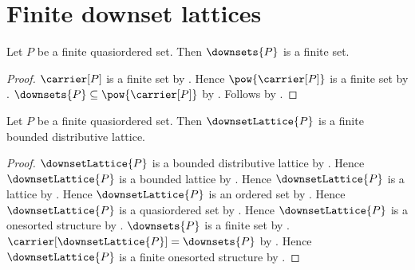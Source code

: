 \section{Finite downset lattices}





\begin{proposition}\label{finite_downsets}
    Let $P$ be a finite quasiordered set.
    Then $\downsets{P}$ is a finite set.
\end{proposition}
\begin{proof}
    $\carrier[P]$ is a finite set by .
    Hence $\pow{\carrier[P]}$ is a finite set by .
    $\downsets{P}\subseteq\pow{\carrier[P]}$ by
        .
    Follows by .
\end{proof}

\begin{theorem}\label{finite_downset_lattice}
    Let $P$ be a finite quasiordered set.
    Then $\downsetLattice{P}$ is a finite bounded distributive lattice.
\end{theorem}
\begin{proof}
    $\downsetLattice{P}$ is a bounded distributive lattice by
        .
    Hence $\downsetLattice{P}$ is a bounded lattice by
        .
    Hence $\downsetLattice{P}$ is a lattice by .
    Hence $\downsetLattice{P}$ is an ordered set by
        .
    Hence $\downsetLattice{P}$ is a quasiordered set by
        .
    Hence $\downsetLattice{P}$ is a onesorted structure by
        .
    $\downsets{P}$ is a finite set by .
    $\carrier[\downsetLattice{P}]=\downsets{P}$ by
        .
    Hence $\downsetLattice{P}$ is a finite onesorted structure by
        .
\end{proof}
